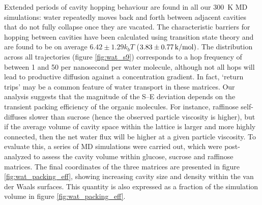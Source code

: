 Extended periods of cavity hopping behaviour are found in all our \SI{300}{\kelvin} MD simulations: water repeatedly moves back and forth between adjacent cavities that do not fully collapse once they are vacated. The characteristic barriers for hopping between cavities have been calculated using transition state theory and are found to be on average $\num{6.42}\pm\num{1.29}k_{b}T$ ($\num{3.83}\pm\SI{0.77}{\kilo\cal\per\mol})$. The distribution across all trajectories (figure \ref{fig:wat_s9}) corresponds to a hop frequency of between \num{1} and \num{50} per nanosecond per water molecule, although not all hops will lead to productive diffusion against a concentration gradient. In fact, `return trips’ may be a common feature of water transport in these matrices.
Our analysis suggests that the magnitude of the S–E deviation depends on the transient packing efficiency of the organic molecules. For instance, raffinose self-diffuses slower than sucrose (hence the observed particle viscosity is higher), but if the average volume of cavity space within the lattice is larger and more highly connected, then the net water flux will be higher at a given particle viscosity. To evaluate this,  a series of MD simulations were carried out, which were post-analyzed to assess the cavity volume within glucose, sucrose and raffinose matrices. The final coordinates of the three matrices are presented in figure \ref{fig:wat_packing_eff}, showing increasing cavity size and density within the van der Waals surfaces. This quantity is also expressed as a fraction of the simulation volume in figure \ref{fig:wat_packing_eff}.

